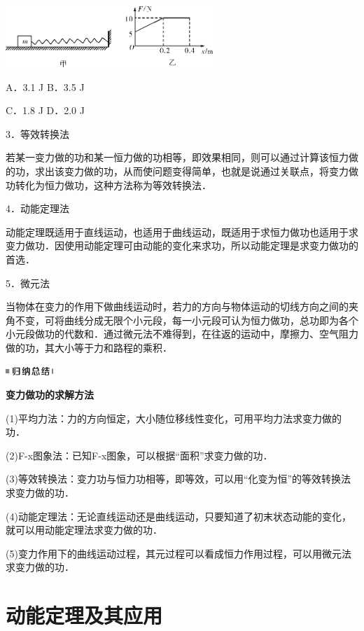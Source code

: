 \begin{center}\includegraphics[width=3.08333in,height=0.91667in]{media/image213.png}\end{center}

A．3.1 J B．3.5 J

C．1.8 J D．2.0 J

3．等效转换法

若某一变力做的功和某一恒力做的功相等，即效果相同，则可以通过计算该恒力做的功，求出该变力做的功，从而使问题变得简单，也就是说通过关联点，将变力做功转化为恒力做功，这种方法称为等效转换法．


4．动能定理法

动能定理既适用于直线运动，也适用于曲线运动，既适用于求恒力做功也适用于求变力做功．因使用动能定理可由动能的变化来求功，所以动能定理是求变力做功的首选．



5．微元法

当物体在变力的作用下做曲线运动时，若力的方向与物体运动的切线方向之间的夹角不变，可将曲线分成无限个小元段，每一小元段可认为恒力做功，总功即为各个小元段做功的代数和．通过微元法不难得到，在往返的运动中，摩擦力、空气阻力做的功，其大小等于力和路程的乘积．


\begin{center}\includegraphics[width=0.70833in,height=0.125in]{media/image13.png}

\textbf{变力做功的求解方法}
\end{center}


(1)平均力法：力的方向恒定，大小随位移线性变化，可用平均力法求变力做的功．

(2)F-x图象法：已知F-x图象，可以根据``面积''求变力做的功．

(3)等效转换法：变力功与恒力功相等，即等效，可以用``化变为恒''的等效转换法求变力做的功．

(4)动能定理法：无论直线运动还是曲线运动，只要知道了初末状态动能的变化，就可以用动能定理法求变力做的功．

(5)变力作用下的曲线运动过程，其元过程可以看成恒力作用过程，可以用微元法求变力做的功．

\newpage
\section{动能定理及其应用}


